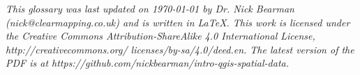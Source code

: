 \documentclass[a4paper,10pt]{article}
\begin{document}
\begin{center}

{\footnotesize \textit{This glossary was last updated on {\today} by Dr. Nick Bearman (nick@clearmapping.co.uk) and is written in LaTeX. This work is licensed under the Creative Commons Attribution-ShareAlike 4.0 International License, http://creativecommons.org/ licenses/by-sa/4.0/deed.en. The latest version of the PDF is at https://github.com/nickbearman/intro-qgis-spatial-data.}}

\end{center}
\end{document}
